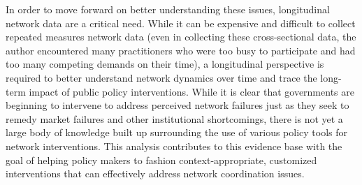 \documentclass[12pt,a4paper,titlepage]{article}
\begin{document}
In order to move forward on better understanding these issues, longitudinal network data are a critical need. While it can be expensive and difficult to collect repeated measures network data (even in collecting these cross-sectional data, the author encountered many practitioners who were too busy to participate and had too many competing demands on their time), a longitudinal perspective is required to better understand network dynamics over time and trace the long-term impact of public policy interventions. While it is clear that governments are beginning to intervene to address perceived network failures just as they seek to remedy market failures and other institutional shortcomings, there is not yet a large body of knowledge built up surrounding the use of various policy tools for network interventions. This analysis contributes to this evidence base with the goal of helping policy makers to fashion context-appropriate, customized interventions that can effectively address network coordination issues.

\nocite{handcock2014-a,analytics2014,butts2014}

\printbibliography
\end{document}

